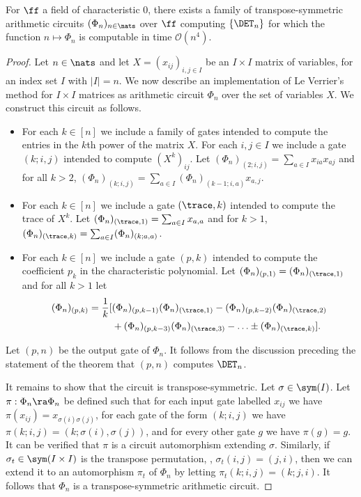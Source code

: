 \documentclass{toc}
\begin{document}
\begin{theorem}
  For $\ff$ %
  a field of characteristic $0$, there exists a family of transpose-symmetric
  arithmetic circuits $(\Phi_n)_{n \in \nats}$ over $\ff$ computing
  $\{\DET_n\}$ for which the function $n \mapsto \Phi_n$ is computable in time
  $\mathcal{O}(n^4)$.
  \label{thm:det-upper-bound}
\end{theorem}
\begin{proof}
  Let $n \in \nats$ and let $X = (x_{ij})_{i, j \in I}$ be an $I \times I$
  matrix of variables, for an index set $I$ with $\vert I \vert=n$. We now
  describe an implementation of Le Verrier's method for $I \times I$ matrices as
  arithmetic circuit $\Phi_n$ over the set of variables $X$. We construct this
  circuit as follows.
  \begin{itemize}
  \item For each $k \in [n]$ we include a family of gates intended to compute
    the entries in the $k$th power of the matrix $X$. For each $i, j \in I$ we
    include a gate $(k; i, j)$ intended to compute $(X^k)_{ij}$. Let
    $(\Phi_n)_{(2; i ,j)} = \sum_{a \in I} x_{ia} x_{aj}$ and for all $k > 2$,
    $(\Phi_n)_{(k; i ,j)} = \sum_{a \in I} (\Phi_n)_{(k-1; i, a)} x_{a, j}$.
  \item For each $k \in [n]$ we include a gate $(\trace, k)$ intended to compute
    the trace of $X^k$. Let $(\Phi_n)_{(\trace, 1)} = \sum_{a \in I} x_{a, a}$
    and for $k > 1$, $(\Phi_n)_{(\trace, k)} = \sum_{a \in I} (\Phi_n)_{(k; a,
      a)}$.
  \item For each $k \in [n]$ we include a gate $(p, k)$ intended to compute the
    coefficient $p_k$ in the characteristic polynomial. Let $(\Phi_n)_{(p, 1)} =
    (\Phi_n)_{(\trace, 1)}$ and for all $k > 1$ let
    \begin{align*}
      (\Phi_n)_{(p, k)} = \frac{1}{k}[&(\Phi_n)_{(p, k - 1)} (\Phi_n)_{(\trace, 1)} - (\Phi_n)_{(p, k - 2)} (\Phi_n)_{(\trace, 2)} \\ &+ (\Phi_n)_{(p, k - 3)} (\Phi_n)_{(\trace, 3)} - \ldots \pm (\Phi_n)_{(\trace, k)}].
    \end{align*}
  \end{itemize}
  Let $(p, n)$ be the output gate of $\Phi_n$. It follows from the discussion
  preceding the statement of the theorem that $(p, n)$ computes $\DET_n$.

  It remains to show that the circuit is transpose-symmetric. Let $\sigma \in
  \sym(I)$. Let $\pi : \Phi_n \ra \Phi_n$ be defined such that for each input
  gate labelled $x_{ij}$ we have $\pi (x_{ij}) = x_{\sigma(i)\sigma(j)}$, for
  each gate of the form $(k; i, j)$ we have $\pi (k; i, j) = (k;
  \sigma(i),\sigma(j))$, and for every other gate $g$ we have $\pi (g) = g$. It
  can be verified that $\pi$ is a circuit automorphism extending $\sigma$.
  Similarly, if $\sigma_t \in \sym(I \times I)$ is the transpose permutation,
  \ie, $\sigma_t(i,j) = (j,i)$, then we can extend it to an automorphism $\pi_t$
  of $\Phi_n$ by letting $\pi_t (k;i,j) = (k;j,i)$. It follows that $\Phi_n$ is
  a transpose-symmetric arithmetic circuit.


\end{proof}
\end{document}

